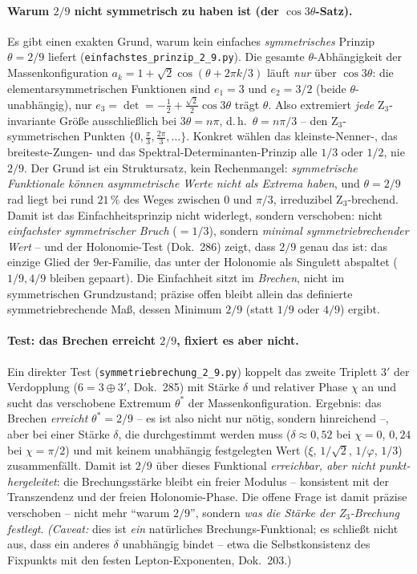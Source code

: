 \paragraph{Warum $2/9$ nicht symmetrisch zu haben ist (der $\cos3\theta$-Satz).} Es gibt einen exakten
Grund, warum kein einfaches \emph{symmetrisches} Prinzip $\theta=2/9$ liefert
(\texttt{einfachstes\_prinzip\_2\_9.py}). Die gesamte $\theta$-Abhängigkeit der Massenkonfiguration
$a_k=1+\sqrt2\cos(\theta+2\pi k/3)$ läuft \emph{nur} über $\cos3\theta$: die elementarsymmetrischen
Funktionen sind $e_1=3$ und $e_2=3/2$ (beide $\theta$-unabhängig), nur
$e_3=\det=-\tfrac12+\tfrac{\sqrt2}{2}\cos3\theta$ trägt $\theta$. Also extremiert \emph{jede}
Z$_3$-invariante Größe ausschließlich bei $3\theta=n\pi$, d.\,h.\ $\theta=n\pi/3$ -- den
Z$_3$-symmetrischen Punkten $\{0,\tfrac{\pi}{3},\tfrac{2\pi}{3},\dots\}$. Konkret wählen das
kleinste-Nenner-, das breiteste-Zungen- und das Spektral-Determinanten-Prinzip alle $1/3$ oder $1/2$,
nie $2/9$. Der Grund ist ein Struktursatz, kein Rechenmangel: \emph{symmetrische Funktionale können
asymmetrische Werte nicht als Extrema haben}, und $\theta=2/9$\,rad liegt bei rund $21\,\%$ des Weges zwischen $0$ und
$\pi/3$, irreduzibel Z$_3$-brechend. Damit ist das Einfachheitsprinzip nicht widerlegt, sondern
verschoben: nicht \emph{einfachster symmetrischer Bruch} ($=1/3$), sondern \emph{minimal
symmetriebrechender Wert} -- und der Holonomie-Test (Dok.~286) zeigt, dass $2/9$ genau das ist: das
einzige Glied der $9$er-Familie, das unter der Holonomie als Singulett abspaltet ($1/9,4/9$ bleiben
gepaart). Die Einfachheit sitzt im \emph{Brechen}, nicht im symmetrischen Grundzustand; präzise offen
bleibt allein das definierte symmetriebrechende Maß, dessen Minimum $2/9$ (statt $1/9$ oder $4/9$)
ergibt.

\paragraph{Test: das Brechen erreicht $2/9$, fixiert es aber nicht.} Ein direkter Test
(\texttt{symmetriebrechung\_2\_9.py}) koppelt das zweite Triplett $3'$ der Verdopplung ($6=3\oplus3'$,
Dok.~285) mit Stärke $\delta$ und relativer Phase $\chi$ an und sucht das verschobene Extremum
$\theta^*$ der Massenkonfiguration. Ergebnis: das Brechen \emph{erreicht} $\theta^*=2/9$ -- es ist also
nicht nur nötig, sondern hinreichend --, aber bei einer Stärke $\delta$, die durchgestimmt werden muss
($\delta\approx0{,}52$ bei $\chi=0$, $0{,}24$ bei $\chi=\pi/2$) und mit keinem unabhängig festgelegten
Wert ($\xi$, $1/\sqrt2$, $1/\varphi$, $1/3$) zusammenfällt. Damit ist $2/9$ über dieses Funktional
\emph{erreichbar, aber nicht punkt-hergeleitet}: die Brechungsstärke bleibt ein freier Modulus --
konsistent mit der Transzendenz und der freien Holonomie-Phase. Die offene Frage ist damit präzise
verschoben -- nicht mehr \enquote{warum $2/9$}, sondern \emph{was die Stärke der Z$_3$-Brechung
festlegt}. \emph{(Caveat:} dies ist \emph{ein} natürliches Brechungs-Funktional; es schließt nicht aus,
dass ein anderes $\delta$ unabhängig bindet -- etwa die Selbstkonsistenz des Fixpunkts mit den festen
Lepton-Exponenten, Dok.~203.)

